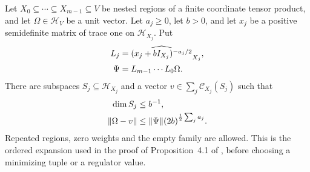 \begin{theorem}
    \label{thm:peps_inverse_filter_cylinders}
    Let $X_0\subseteq\cdots\subseteq X_{m-1}\subseteq V$ be nested regions
    of a finite coordinate tensor product, and let $\Omega\in\mathcal H_V$
    be a unit vector. Let $a_j\ge0$, let $b>0$, and let $x_j$ be a positive
    semidefinite matrix of trace one on $\mathcal H_{X_j}$. Put
    \begin{align}
        L_j  & =\widehat{(x_j+bI_{X_j})^{-a_j/2}}_{X_j}, \notag \\
        \Psi & =L_{m-1}\cdots L_0\Omega. \notag
    \end{align}
    There are subspaces $S_j\subseteq\mathcal H_{X_j}$ and a vector
    $v\in\sum_j\mathcal C_{X_j}(S_j)$ such that
    \begin{align}
        \dim S_j     & \le b^{-1}, \notag                           \\
        \|\Omega-v\| & \le \|\Psi\|(2b)^{\frac12\sum_j a_j}. \notag
    \end{align}
    Repeated regions, zero weights and the empty family are allowed.
    This is the ordered expansion used in the proof of Proposition~4.1
    of \cite{OpenAI2026PolynomialPEPS}, before choosing a minimizing tuple
    or a regulator value.
\end{theorem}
